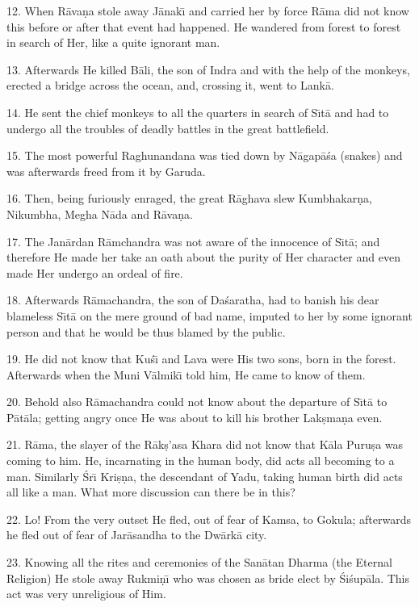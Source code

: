 12. When R\=ava\d{n}a stole away J\=anak\={\i} and carried her by force R\=ama did not know this before or after that event had happened. He wandered from forest to forest in search of Her, like a quite ignorant man.

13. Afterwards He killed B\=ali, the son of Indra and with the help of the monkeys, erected a bridge across the ocean, and, crossing it, went to Lank\=a.

14. He sent the chief monkeys to all the quarters in search of S\={\i}t\=a and had to undergo all the troubles of deadly battles in the great battlefield.

15. The most powerful Raghunandana was tied down by N\=agap\=a\'sa (snakes) and was afterwards freed from it by Garuda.

16. Then, being furiously enraged, the great R\=aghava slew Kumbhakar\d{n}a, Nikumbha, Megha N\=ada and R\=ava\d{n}a.

17. The Jan\=ardan R\=amchandra was not aware of the innocence of S\={\i}t\=a; and therefore He made her take an oath about the purity of Her character and even made Her undergo an ordeal of fire.

18. Afterwards R\=amachandra, the son of Da\'saratha, had to banish his dear blameless S\={\i}t\=a on the mere ground of bad name, imputed to her by some ignorant person and that he would be thus blamed by the public.

19. He did not know that Ku\'s\={\i} and Lava were His two sons, born in the forest. Afterwards when the Muni V\=almik\={\i} told him, He came to know of them.

20. Behold also R\=amachandra could not know about the departure of S\={\i}t\=a to P\=at\=ala; getting angry once He was about to kill his brother Lak\d{s}ma\d{n}a even.

21. R\=ama, the slayer of the R\=ak\d{s}'asa Khara did not know that K\=ala Puru\d{s}a was coming to him. He, incarnating in the human body, did acts all becoming to a man. Similarly \'Sr\={\i} Kri\d{s}\d{n}a, the descendant of Yadu, taking human birth did acts all like a man. What more discussion can there be in this?

22. Lo! From the very outset He fled, out of fear of Kamsa, to Gokula; afterwards he fled out of fear of Jar\=asandha to the Dw\=ark\=a city.

23. Knowing all the rites and ceremonies of the San\=atan Dharma (the Eternal Religion) He stole away Rukmi\d{n}\={\i} who was chosen as bride elect by \'Si\'sup\=ala. This act was very unreligious of Him.

